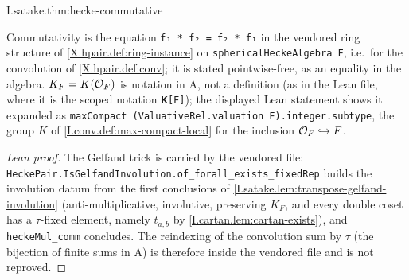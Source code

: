 \begin{theorem}
\end{theorem}
\begin{tfformal}{I.satake.thm:hecke-commutative}
\begin{tffidelity}
Commutativity is the equation \texttt{f₁ * f₂ = f₂ * f₁} in the vendored ring structure of \cref{X.hpair.def:ring-instance} on \texttt{sphericalHeckeAlgebra F}, i.e.\ for the convolution of \cref{X.hpair.def:conv}; it is stated pointwise-free, as an equality in the algebra. $K_F=K(\mathcal{O}_F)$ is notation in A, not a definition (as in the Lean file, where it is the scoped notation \texttt{𝐊[F]}); the displayed Lean statement shows it expanded as \texttt{maxCompact (ValuativeRel.valuation F).integer.subtype}, the group $K$ of \cref{I.conv.def:max-compact-local} for the inclusion $\mathcal{O}_F\hookrightarrow F$.
\end{tffidelity}
\end{tfformal}
\begin{proof}[Lean proof]
The Gelfand trick is carried by the vendored file: \texttt{HeckePair.IsGelfandInvolution.of\_forall\_exists\_fixedRep} builds the involution datum from the first conclusions of \cref{I.satake.lem:transpose-gelfand-involution} (anti-multiplicative, involutive, preserving $K_F$, and every double coset has a $\tau$-fixed element, namely $t_{a,b}$ by \cref{I.cartan.lem:cartan-exists}), and \texttt{heckeMul\_comm} concludes. The reindexing of the convolution sum by $\tau$ (the bijection of finite sums in A) is therefore inside the vendored file and is not reproved.
\end{proof}



